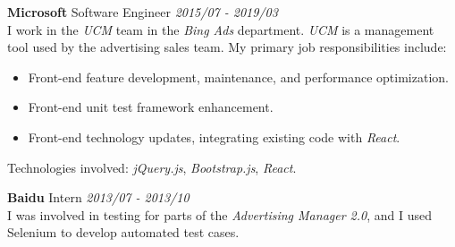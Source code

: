 \documentclass[a4paper]{article}
\newenvironment{changemargin}[2]{%
  \begin{list}{}{%
    \setlength{\topsep}{0pt}%
    \setlength{\leftmargin}{#1}%
    \setlength{\rightmargin}{#2}%
    \setlength{\listparindent}{\parindent}%
    \setlength{\itemindent}{\parindent}%
    \setlength{\parsep}{\parskip}%
  }%
  \item[]}{\end{list}
}
\newenvironment{body} {
	\vspace*{-16pt}
	\begin{changemargin}{-0.5in}{-0.5in}
  }
	{\end{changemargin}
}
\begin{document}
\begin{body}
	\medskip

	\textbf{Microsoft} \hfill Software Engineer \emph{2015/07 - 2019/03} \\
	\smallskip
	I work in the \emph{UCM} team in the \emph{Bing Ads} department. \emph{UCM} is a management tool used by the advertising sales team. My primary job responsibilities include:
	\begin{itemize} \itemsep -0pt  %
		\item Front-end feature development, maintenance, and performance optimization.\\
	\end{itemize}
	\vspace*{-8pt}
	\begin{itemize} \itemsep -0pt  %
		\item Front-end unit test framework enhancement.\\
	\end{itemize}
	\vspace*{-8pt}
	\begin{itemize} \itemsep -0pt  %
		\item Front-end technology updates, integrating existing code with \emph{React}.\\
	\end{itemize}
	Technologies involved: \emph{jQuery.js}, \emph{Bootstrap.js}, \emph{React}.\\

	\medskip
	
	\textbf{Baidu} \hfill Intern \emph{2013/07 - 2013/10}\\ 
	\smallskip
	I was involved in testing for parts of the \emph{Advertising Manager 2.0}, and I used Selenium to develop automated test cases.
	\medskip
	

\end{body}
\end{document}
